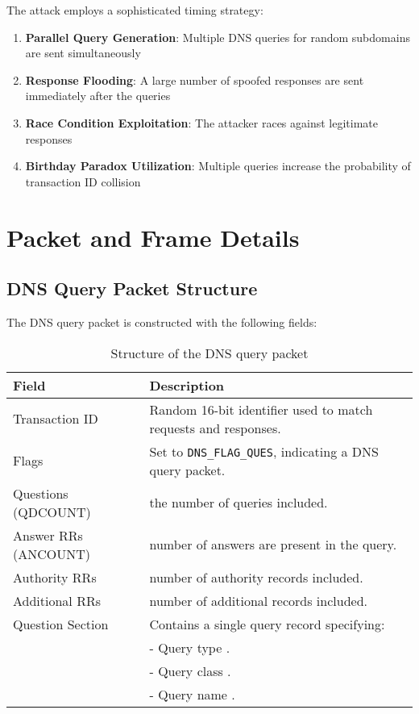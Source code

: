 \documentclass[12pt,a4paper]{article}
\begin{document}
The attack employs a sophisticated timing strategy:

\begin{enumerate}
    \item \textbf{Parallel Query Generation}: Multiple DNS queries for random subdomains are sent simultaneously
    \item \textbf{Response Flooding}: A large number of spoofed responses are sent immediately after the queries
    \item \textbf{Race Condition Exploitation}: The attacker races against legitimate responses
    \item \textbf{Birthday Paradox Utilization}: Multiple queries increase the probability of transaction ID collision
\end{enumerate}

\section{Packet and Frame Details}

\subsection{DNS Query Packet Structure}

The DNS query packet is constructed with the following fields\cite{cert-dns}:

\begin{table}[H]
\centering
\begin{tabular}{|l|p{8cm}|}
\hline
\textbf{Field} & \textbf{Description} \\
\hline
Transaction ID & Random 16-bit identifier  used to match requests and responses. \\
\hline
Flags & Set to \texttt{DNS\_FLAG\_QUES}, indicating a DNS query packet. \\
\hline
Questions (QDCOUNT) &  the number of queries included. \\
\hline
Answer RRs (ANCOUNT) &  number of answers are present in the query. \\
\hline
Authority RRs & number of authority records included. \\
\hline
Additional RRs & number of  additional records included. \\
\hline
Question Section & Contains a single query record specifying: \\
& \quad - Query type . \\
& \quad - Query class . \\
& \quad - Query name . \\
\hline
\end{tabular}
\caption{Structure of the DNS query packet}
\end{table}
\end{document}
